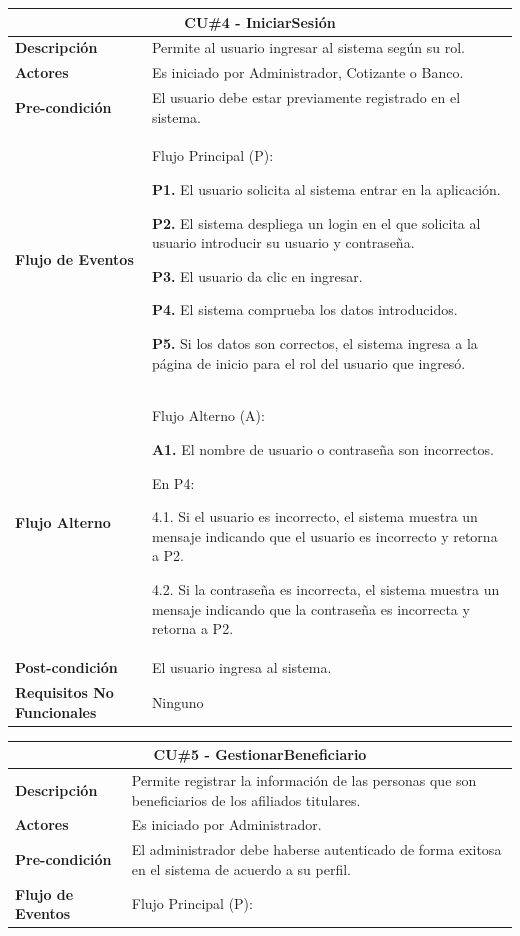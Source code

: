 \documentclass[12pt,a4paper]{article}
\begin{document}
\begin{center}
\begin{tabular}{|p{5.5cm}| p{9.5cm}|}
\hline 
\multicolumn{2}{|c|}{\textbf{CU\#4 - IniciarSesión}} \\ 
\hline 
\textbf{Descripción} & Permite al usuario ingresar al sistema según su rol. \\ 
\hline 
\textbf{Actores} & Es iniciado por Administrador, Cotizante o Banco. \\ 
\hline 
\textbf{Pre-condición} & El usuario debe estar previamente registrado en el sistema. \\ 
\hline 
\textbf{Flujo de Eventos} & Flujo Principal (P):

\textbf{P1.} El usuario solicita al sistema entrar en la aplicación.

\textbf{P2.} El sistema despliega un login en el que solicita al usuario introducir su usuario y contraseña.

\textbf{P3.} El usuario da clic en ingresar.

\textbf{P4.} El sistema comprueba los datos introducidos.

\textbf{P5.} Si los datos son correctos, el sistema ingresa a la página de inicio para el rol del usuario que ingresó.
\\
\hline 
\textbf{Flujo Alterno} &  Flujo Alterno (A):

\textbf{A1.} El nombre de usuario o contraseña son incorrectos.

	En P4:
	
	4.1. Si el usuario es incorrecto, el sistema muestra un mensaje indicando que el usuario es incorrecto y retorna a P2.
	
	4.2. Si la contraseña es incorrecta, el sistema muestra un mensaje indicando que la contraseña es incorrecta y retorna a P2. \\ 
\hline 
\textbf{Post-condición}  & El usuario ingresa al sistema. \\ 
\hline 
\textbf{Requisitos No Funcionales} & Ninguno \\ 
\hline 
\end{tabular}
\vspace{5mm}

\begin{tabular}{|p{5.5cm}| p{9.5cm}|}
\hline 
\multicolumn{2}{|c|}{\textbf{CU\#5 - GestionarBeneficiario}} \\ 
\hline 
\textbf{Descripción} & Permite registrar la información de las personas que son beneficiarios de los afiliados titulares. \\ 
\hline 
\textbf{Actores} & Es iniciado por Administrador. \\ 
\hline 
\textbf{Pre-condición} & El administrador debe haberse autenticado de forma exitosa en el sistema de acuerdo a su perfil. \\ 
\hline 
\textbf{Flujo de Eventos} & Flujo Principal (P):


\end{tabular}
\end{center}
\end{document}
